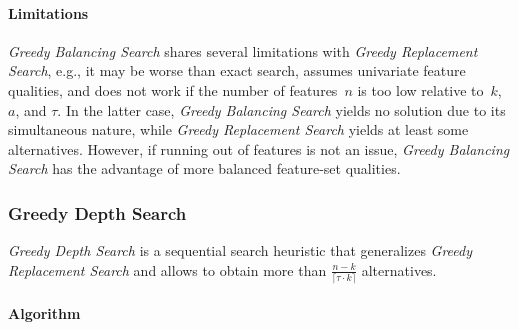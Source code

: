 \documentclass{article}
\theoremstyle{definition}
\begin{document}
\paragraph{Limitations}

\emph{Greedy Balancing Search} shares several limitations with \emph{Greedy Replacement Search}, e.g., it may be worse than exact search, assumes univariate feature qualities, and does not work if the number of features~$n$ is too low relative to~$k$, $a$, and $\tau$.
In the latter case, \emph{Greedy Balancing Search} yields no solution due to its simultaneous nature, while \emph{Greedy Replacement Search} yields at least some alternatives.
However, if running out of features is not an issue, \emph{Greedy Balancing Search} has the advantage of more balanced feature-set qualities.

\subsubsection{Greedy Depth Search}
\label{sec:afs:approach:univariate-heuristics:greedy-depth}

\emph{Greedy Depth Search} is a sequential search heuristic that generalizes \emph{Greedy Replacement Search} and allows to obtain more than $\frac{n - k}{\lceil \tau \cdot k \rceil}$ alternatives.

\paragraph{Algorithm}
\end{document}

